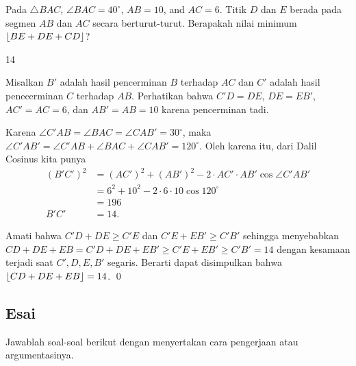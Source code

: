 \documentclass[11pt]{scrartcl}
\begin{document}
	\begin{soalbaru}
		Pada $\triangle BAC$, $\angle BAC = 40^\circ$, $AB=10$, and $AC=6$. Titik $D$ dan $E$ berada pada segmen $AB$ dan $AC$ secara berturut-turut. Berapakah nilai minimum $\left\lfloor BE+DE+CD \right\rfloor$?
		
		\begin{jawaban}
		14
		\end{jawaban}
		\begin{solusi}
		Misalkan $B'$ adalah hasil pencerminan $B$ terhadap $AC$ dan $C'$ adalah hasil penecerminan $C$ terhadap $AB$. Perhatikan bahwa $C'D=DE$, $DE=EB'$, $AC'=AC=6$, dan $AB'=AB=10$ karena pencerminan tadi. 
		
		Karena $\angle C'AB = \angle BAC = \angle CAB'=30^\circ$, maka $\angle C'AB' = \angle C'AB + \angle BAC + \angle CAB' = 120^\circ$. Oleh karena itu, dari Dalil Cosinus kita punya 
		\begin{align*}
		(B'C')^2 &= (AC')^2+(AB')^2-2\cdot AC' \cdot AB' \cos \angle C'AB'\\
		&= 6^2+10^2-2\cdot 6\cdot 10 \cos 120^\circ\\
		&= 196\\
		B'C' &= 14.
		\end{align*} 
		
		Amati bahwa $C'D+DE \ge C'E$ dan $C'E+EB' \ge C'B'$ sehingga menyebabkan \\$CD+DE+EB=C'D+DE+EB' \ge C'E +EB' \ge C'B'=14$ dengan kesamaan terjadi saat $C',D,E,B'$ segaris. Berarti dapat disimpulkan bahwa $\left\lfloor CD+DE+EB \right\rfloor=14$. \qed
		\end{solusi}
	\end{soalbaru}

\subsection{Esai}
Jawablah soal-soal berikut dengan menyertakan cara pengerjaan atau argumentasinya.
	
\end{document}
